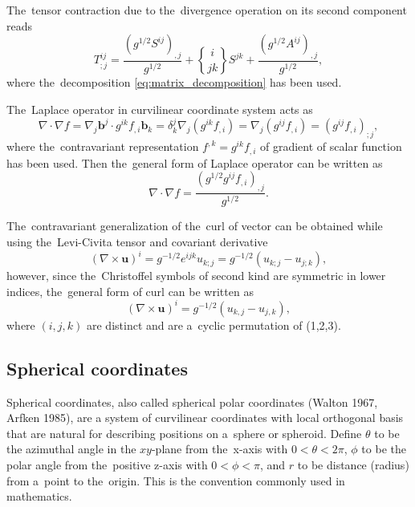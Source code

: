 \documentclass[review]{elsarticle}
\newcommand{\vect}[1]{\boldsymbol{#1}}
\newcommand{\christ}[3]{\genfrac{\{}{\}}{0pt}{}{#1}{#2 #3}}
\begin{document}
The~tensor contraction due to the~divergence operation on its second component
reads
\begin{equation}
  T^{ij}_{;j} = \frac{(g^{1/2}S^{ij})_{,j}}{g^{1/2}} + \christ{i}{j}{k}S^{jk} 
  + \frac{(g^{1/2}A^{ij})_{,j}}{g^{1/2}} ,
  \label{eq:general_divtens}
\end{equation}
where the~decomposition \eqref{eq:matrix_decomposition} has been used.

The~Laplace operator in curvilinear coordinate system acts as
\begin{equation}
  \nabla\cdot\nabla f = \nabla_j\vect{b}^j\cdot g^{ik}f_{,i}\vect{b}_k = 
  \delta^j_k \nabla_j (g^{ik}f_{,i}) = \nabla_j (g^{ij}f_{,i}) 
  = (g^{ij}f_{,i})_{;j} , 
  \nonumber
\end{equation}
where the~contravariant representation $f^{,k} = g^{ik}f_{,i}$ of gradient
of scalar function has been used.
Then the~general form of Laplace operator can be written as
\begin{equation}
  \nabla\cdot\nabla f = \frac{(g^{1/2}g^{ij}f_{,i})_{,j}}{g^{1/2}} .
  \label{eq:general_Laplace}
\end{equation}

The~contravariant generalization of the~curl of vector can be obtained while
using the~Levi-Civita tensor and covariant derivative
\begin{equation}
  (\nabla\times\vect{u})^i = g^{-1/2}e^{ijk} u_{k;j} 
  = g^{-1/2} (u_{k;j} - u_{j;k}) ,
  \nonumber
\end{equation} 
however, since the~Christoffel symbols of second kind are symmetric in lower 
indices, the~general form of curl can be written as 
\begin{equation}
  (\nabla\times\vect{u})^i = g^{-1/2} (u_{k,j} - u_{j,k}) ,
  \label{eq:general_curlvec}
\end{equation} 
where $(i,j,k)$ are distinct and are a~cyclic permutation of (1,2,3).

\subsection{Spherical coordinates}
Spherical coordinates, also called spherical polar coordinates 
(Walton 1967, Arfken 1985), are a system of curvilinear coordinates with 
local orthogonal basis that are natural for describing positions on a~sphere 
or spheroid. Define $\theta$ to be the azimuthal angle in the $xy$-plane from 
the~x-axis with $0<\theta<2\pi$, $\phi$ to be the polar angle from 
the~positive z-axis with $0<\phi<\pi$, and $r$ to be distance (radius) from 
a~point to the~origin. This is the convention commonly used in mathematics. 
\end{document}

